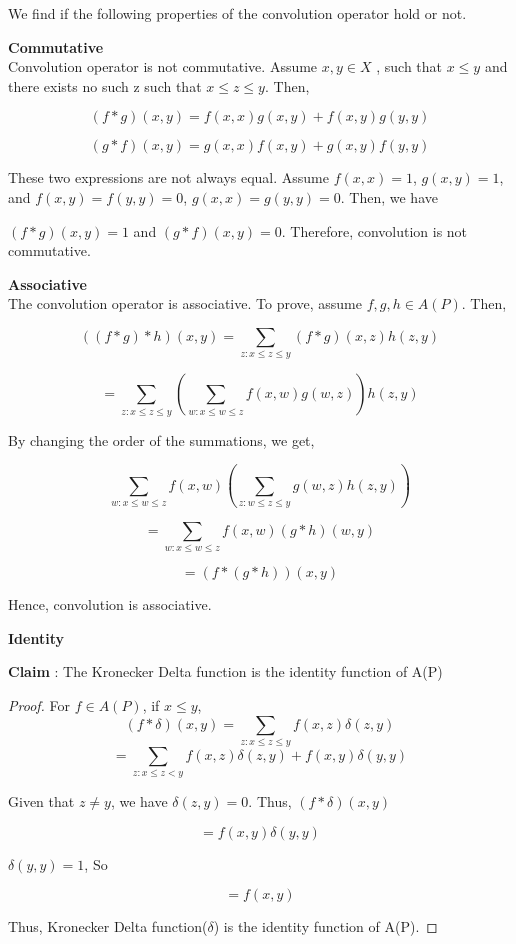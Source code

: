 We find if  the following properties of the convolution operator hold or not.

\textbf{Commutative} \\

Convolution operator is not commutative. Assume $x,y \in X$ , such that $x \le y$ and there exists no such z such that $x \le z \le y$. Then,

$$ (f*g)(x,y) = f(x,x)g(x,y) + f(x,y)g(y,y)$$

$$ (g*f)(x,y) = g(x,x)f(x,y) + g(x,y)f(y,y)$$

These two expressions are not always equal. Assume $f(x,x) = 1$, $g(x,y) = 1$, and $f(x,y) = f(y,y) = 0$, $g(x,x) = g(y,y) = 0$. Then, we have

 $(f*g)(x,y) = 1$ and $(g*f)(x,y) = 0$. Therefore, convolution is not commutative.
 
\textbf{Associative}\\

The convolution operator is associative. To prove, assume $f,g,h \in A(P)$. Then,

$$((f*g)*h)(x, y) = \sum_{z: x \le z \le y}(f*g)(x, z) h(z, y)$$

$$ = \sum_{z: x \le z \le y}(\sum_{w: x \le w \le z}f(x, w)g(w, z))h(z, y)$$

By changing the order of the summations, we get,

$$ \sum_{w: x \le w \le z}f(x, w)(\sum_{z : w \le z \le y}g(w, z)h(z, y))$$

$$ = \sum_{w: x \le w \le z}f(x, w) (g*h)(w,y) $$

$$ = (f*(g*h)) (x,y)$$

Hence, convolution is associative.


\textbf{Identity}

\textbf{Claim} : The Kronecker Delta function is the identity function of A(P)

\begin{proof}
For $f \in A(P)$, if $x \le y$,
$$ (f*\delta)(x,y) = \sum_{z:x\le z \le y} f(x,z)\delta(z,y)$$
$$ =  \sum_{z:x\le z < y} f(x,z)\delta(z,y) + f(x,y)\delta(y,y)$$

Given that $z \ne y$, we have $\delta(z,y) = 0$. Thus, $(f*\delta)(x,y)$

$$ = f(x,y)\delta(y,y)$$

$\delta(y,y) = 1$, So

$$ = f(x,y) $$ 

Thus, Kronecker Delta function($\delta$) is the identity function of A(P).

\end{proof}

